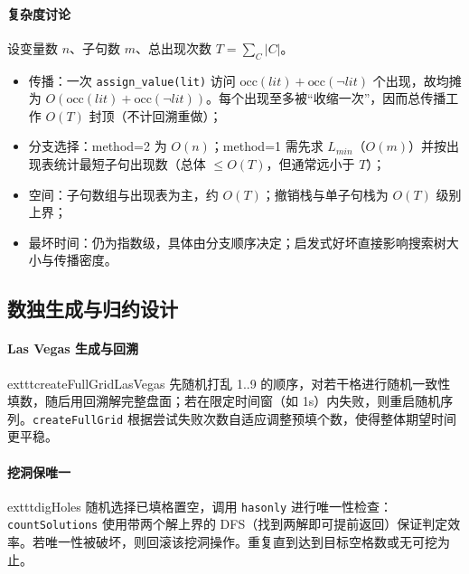 \documentclass[UTF8]{ctexart}
\begin{document}
\paragraph{复杂度讨论}
设变量数 \(n\)、子句数 \(m\)、总出现次数 \(T=\sum_C |C|\)。
\begin{itemize}
  \item 传播：一次 \texttt{assign\_value(lit)} 访问 \(\text{occ}(lit) + \text{occ}(\lnot lit)\) 个出现，故均摊为 \(O(\text{occ}(lit)+\text{occ}(\lnot lit))\)。每个出现至多被“收缩一次”，因而总传播工作 \(O(T)\) 封顶（不计回溯重做）；
  \item 分支选择：method=2 为 \(O(n)\)；method=1 需先求 \(L_{min}\)（\(O(m)\)）并按出现表统计最短子句出现数（总体 \(\le O(T)\)，但通常远小于 \(T\)）；
  \item 空间：子句数组与出现表为主，约 \(O(T)\)；撤销栈与单子句栈为 \(O(T)\) 级别上界；
  \item 最坏时间：仍为指数级，具体由分支顺序决定；启发式好坏直接影响搜索树大小与传播密度。
\end{itemize}

\subsection{数独生成与归约设计}
\paragraph{Las Vegas 生成与回溯}
  exttt{createFullGridLasVegas} 先随机打乱 1..9 的顺序，对若干格进行随机一致性填数，随后用回溯解完整盘面；若在限定时间窗（如 1s）内失败，则重启随机序列。\texttt{createFullGrid} 根据尝试失败次数自适应调整预填个数，使得整体期望时间更平稳。

\paragraph{挖洞保唯一}
  exttt{digHoles} 随机选择已填格置空，调用 \texttt{hasonly} 进行唯一性检查：\texttt{countSolutions} 使用带两个解上界的 DFS（找到两解即可提前返回）保证判定效率。若唯一性被破坏，则回滚该挖洞操作。重复直到达到目标空格数或无可挖为止。
\end{document}

